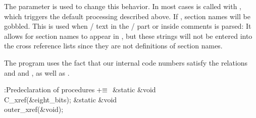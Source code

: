 The parameter  is used to change this behavior. In most
cases
 is called with , which
triggers the default
processing described above. If ,
section names will
be gobbled. This is used when \CEE/ text in the \TEX/ part or inside comments
is parsed: It allows for section names to appear in \pb, but these
strings will not be entered into the cross reference lists since they are not
definitions of section names.

The program uses the fact that our internal code numbers satisfy
the relations  and  and ,
as well as .

\Y\B\4:Predeclaration of procedures\X${}\mathrel+\equiv{}$\6
\&{static} \&{void} \\{C\_xref}(\&{eight\_bits});\6
\&{static} \&{void} \\{outer\_xref}(\&{void});\par
\fi

